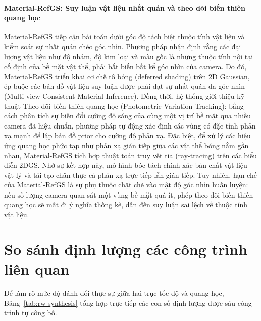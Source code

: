 \paragraph{Material-RefGS: Suy luận vật liệu nhất quán và theo dõi biến thiên quang học}
\label{para:materialrefgs-detail}
Material-RefGS \cite{zhang2025materialrefgs} tiếp cận bài toán dưới góc độ tách biệt thuộc tính vật liệu và kiểm soát sự nhất quán chéo góc nhìn. Phương pháp nhận định rằng các đại lượng vật liệu như độ nhám, độ kim loại và màu gốc là những thuộc tính nội tại cố định của bề mặt vật thể, phải bất biến bất kể góc nhìn của camera. Do đó, Material-RefGS triển khai cơ chế tô bóng (deferred shading) trên 2D Gaussian, ép buộc các bản đồ vật liệu suy luận được phải đạt sự nhất quán đa góc nhìn (Multi-view Consistent Material Inference). Đồng thời, hệ thống giới thiệu kỹ thuật Theo dõi biến thiên quang học (Photometric Variation Tracking): bằng cách phân tích sự biến đổi cường độ sáng của cùng một vị trí bề mặt qua nhiều camera đã hiệu chuẩn, phương pháp tự động xác định các vùng có đặc tính phản xạ mạnh để lập bản đồ prior cho cường độ phản xạ. Đặc biệt, để xử lý các hiệu ứng quang học phức tạp như phản xạ gián tiếp giữa các vật thể bóng nằm gần nhau, Material-RefGS tích hợp thuật toán truy vết tia (ray-tracing) trên các biểu diễn 2DGS. Nhờ sự kết hợp này, mô hình bóc tách chính xác bản chất vật liệu vật lý và tái tạo chân thực cả phản xạ trực tiếp lẫn gián tiếp. Tuy nhiên, hạn chế của Material-RefGS là sự phụ thuộc chặt chẽ vào mật độ góc nhìn huấn luyện: nếu số lượng camera quan sát một vùng bề mặt quá ít, phép theo dõi biến thiên quang học sẽ mất đi ý nghĩa thống kê, dẫn đến suy luận sai lệch về thuộc tính vật liệu.

\section{So sánh định lượng các công trình liên quan}
\label{sec:synthesis}

Để làm rõ mức độ đánh đổi thực sự giữa hai trục tốc độ và quang học, Bảng~\ref{tab:rw-synthesis} tổng hợp trực tiếp các con số định lượng được sáu công trình tự công bố.

\begingroup
\small
\renewcommand{\arraystretch}{1.3}
\setlength{\tabcolsep}{4pt}

